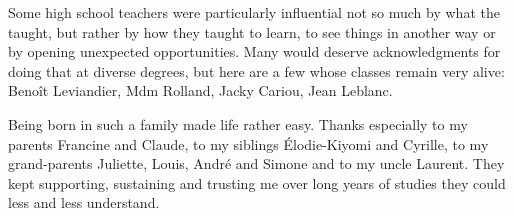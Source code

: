 Some high school teachers were particularly influential not so much by what the taught, but rather by how they taught to learn, to see things in another way or by opening unexpected opportunities. Many would deserve acknowledgments for doing that at diverse degrees, but here are a few whose classes remain very alive: Beno\^{i}t Leviandier, Mdm Rolland, Jacky Cariou, Jean Leblanc.

Being born in such a family made life rather easy. Thanks especially to my parents Francine and Claude, to my siblings \'{E}lodie-Kiyomi and Cyrille, to my grand-parents Juliette, Louis, Andr\'{e} and Simone and to my uncle Laurent. They kept supporting, sustaining and trusting me over long years of studies they could less and less understand.